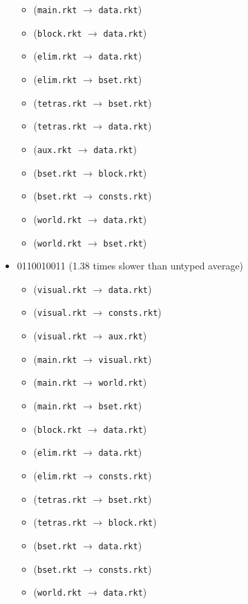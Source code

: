 \documentclass{article}
\newcommand{\mono}[1]{\texttt{#1}}
\begin{document}
\begin{itemize}
\begin{itemize}
  \item (\mono{main.rkt} $\rightarrow$ \mono{data.rkt})
  \item (\mono{block.rkt} $\rightarrow$ \mono{data.rkt})
  \item (\mono{elim.rkt} $\rightarrow$ \mono{data.rkt})
  \item (\mono{elim.rkt} $\rightarrow$ \mono{bset.rkt})
  \item (\mono{tetras.rkt} $\rightarrow$ \mono{bset.rkt})
  \item (\mono{tetras.rkt} $\rightarrow$ \mono{data.rkt})
  \item (\mono{aux.rkt} $\rightarrow$ \mono{data.rkt})
  \item (\mono{bset.rkt} $\rightarrow$ \mono{block.rkt})
  \item (\mono{bset.rkt} $\rightarrow$ \mono{consts.rkt})
  \item (\mono{world.rkt} $\rightarrow$ \mono{data.rkt})
  \item (\mono{world.rkt} $\rightarrow$ \mono{bset.rkt})
  \end{itemize}
\item 0110010011 (1.38 times slower than untyped average)
  \begin{itemize}
  \item (\mono{visual.rkt} $\rightarrow$ \mono{data.rkt})
  \item (\mono{visual.rkt} $\rightarrow$ \mono{consts.rkt})
  \item (\mono{visual.rkt} $\rightarrow$ \mono{aux.rkt})
  \item (\mono{main.rkt} $\rightarrow$ \mono{visual.rkt})
  \item (\mono{main.rkt} $\rightarrow$ \mono{world.rkt})
  \item (\mono{main.rkt} $\rightarrow$ \mono{bset.rkt})
  \item (\mono{block.rkt} $\rightarrow$ \mono{data.rkt})
  \item (\mono{elim.rkt} $\rightarrow$ \mono{data.rkt})
  \item (\mono{elim.rkt} $\rightarrow$ \mono{consts.rkt})
  \item (\mono{tetras.rkt} $\rightarrow$ \mono{bset.rkt})
  \item (\mono{tetras.rkt} $\rightarrow$ \mono{block.rkt})
  \item (\mono{bset.rkt} $\rightarrow$ \mono{data.rkt})
  \item (\mono{bset.rkt} $\rightarrow$ \mono{consts.rkt})
  \item (\mono{world.rkt} $\rightarrow$ \mono{data.rkt})

\end{itemize}
\end{itemize}
\end{document}
